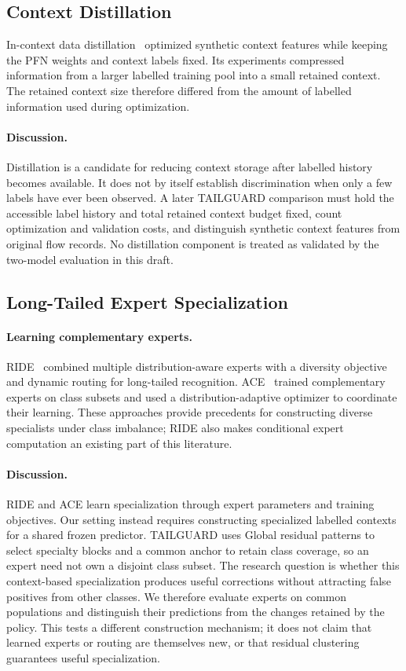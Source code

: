\documentclass[sigconf,anonymous,pbalance]{acmart}
\begin{document}
\subsection{Context Distillation}
In-context data distillation~\cite{ma2024icd} optimized synthetic context features while keeping the PFN weights and context labels fixed. Its experiments compressed information from a larger labelled training pool into a small retained context. The retained context size therefore differed from the amount of labelled information used during optimization.

\paragraph{Discussion.}
Distillation is a candidate for reducing context storage after labelled history becomes available. It does not by itself establish discrimination when only a few labels have ever been observed. A later TAILGUARD comparison must hold the accessible label history and total retained context budget fixed, count optimization and validation costs, and distinguish synthetic context features from original flow records. No distillation component is treated as validated by the two-model evaluation in this draft.

\subsection{Long-Tailed Expert Specialization}
\paragraph{Learning complementary experts.}
RIDE~\cite{wang2020long} combined multiple distribution-aware experts with a diversity objective and dynamic routing for long-tailed recognition. ACE~\cite{Cai_2021_ICCV} trained complementary experts on class subsets and used a distribution-adaptive optimizer to coordinate their learning. These approaches provide precedents for constructing diverse specialists under class imbalance; RIDE also makes conditional expert computation an existing part of this literature.

\paragraph{Discussion.}
RIDE and ACE learn specialization through expert parameters and training objectives. Our setting instead requires constructing specialized labelled contexts for a shared frozen predictor. TAILGUARD uses Global residual patterns to select specialty blocks and a common anchor to retain class coverage, so an expert need not own a disjoint class subset. The research question is whether this context-based specialization produces useful corrections without attracting false positives from other classes. We therefore evaluate experts on common populations and distinguish their predictions from the changes retained by the policy. This tests a different construction mechanism; it does not claim that learned experts or routing are themselves new, or that residual clustering guarantees useful specialization.
\end{document}
